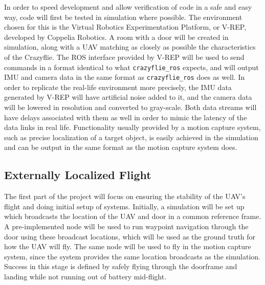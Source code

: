 \documentclass[12pt]{article}
\begin{document}
In order to speed development and allow verification of code in a safe and easy way, code will first be tested in simulation where possible. The environment chosen for this is the Virtual Robotics Experimentation Platform, or V-REP, developed by Coppelia Robotics. A room with a door will be created in simulation, along with a UAV matching as closely as possible the characteristics of the Crazyflie. The ROS interface provided by V-REP will be used to send commands in a format identical to what \verb|crazyflie_ros| expects, and will output IMU and camera data in the same format as \verb|crazyflie_ros| does as well. In order to replicate the real-life environment more precisely, the IMU data generated by V-REP will have artificial noise added to it, and the camera data will be lowered in resolution and converted to gray-scale. Both data streams will have delays associated with them as well in order to mimic the latency of the data links in real life. Functionality usually provided by a motion capture system, such as precise localization of a target object, is easily achieved in the simulation and can be output in the same format as the motion capture system does.

\subsection{Externally Localized Flight}
The first part of the project will focus on ensuring the stability of the UAV's flight and doing initial setup of systems. Initially, a simulation will be set up which broadcasts the location of the UAV and door in a common reference frame. A pre-implemented node will be used to run waypoint navigation through the door using these broadcast locations, which will be used as the ground truth for how the UAV will fly. The same node will be used to fly in the motion capture system, since the system provides the same location broadcasts as the simulation. Success in this stage is defined by safely flying through the doorframe and landing while not running out of battery mid-flight. 
\end{document}
